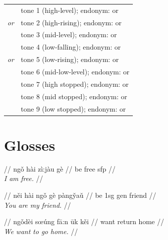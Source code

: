 \documentclass{article}
\begin{document}
\begin{xltabular}{\textwidth}{lL}
   & tone 1 (high-level); endonym:  or  \\
   \textit{or}  & tone 2 (high-rising); endonym:  or  \\
   & tone 3 (mid-level); endonym:  or  \\
   & tone 4 (low-falling); endonym:  or  \\
   \textit{or}  & tone 5 (low-rising); endonym:  or  \\
   & tone 6 (mid-low-level); endonym:  or  \\
   & tone 7 (high stopped); endonym:  or  \\
   & tone 8 (mid stopped); endonym:  or  \\
   & tone 9 (low stopped); endonym:  or  \\
\end{xltabular}

\newpage\section{Glosses}

\ex
\begingl
\gla {}    //
\glb ng\v{o} h\`ai z\`{i}:j\`{a}u g\`e //
 be free {\sc sfp} //
\\\textit{I am free.} //
\endgl
\xe

\ex
\begingl
\gla {}     //
\glb n\v{e}i h\`ai ng\v{o} g\`e p\`{a}ng\v{y}a\v{u} //
 be {\sc 1sg} {\sc gen} friend //
\\\textit{You are my friend.} //
\endgl
\xe

\ex
\begingl
\gla {}    //
\glb ng\v{o}d\`ei s\oe\'{u}ng f\=a:n \=uk k\v{e}i //
 want return home //
\\\textit{We want to go home.} //
\endgl
\xe
\end{document}
